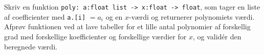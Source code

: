 Skriv en funktion \lstinline{poly: a:float list -> x:float -> float}, som tager en liste af coefficienter med \lstinline{a.[i]} $= a_i$ og en $x$-værdi og returnerer polynomiets værdi. Afprøv funktionen ved at lave tabeller for et lille antal polynomier af forskellig grad med forskellige koefficienter og forskellige værdier for $x$, og valid\'{e}r den beregnede værdi.